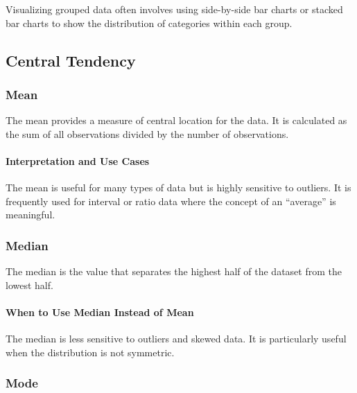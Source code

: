 \documentclass[
  b5paper]{book}
\begin{document}
Visualizing grouped data often involves using side-by-side bar charts or stacked bar charts to show the distribution of categories within each group.

\hypertarget{central-tendency}{%
\subsection{Central Tendency}\label{central-tendency}}

\hypertarget{mean}{%
\subsubsection{Mean}\label{mean}}

The mean provides a measure of central location for the data. It is calculated as the sum of all observations divided by the number of observations.

\hypertarget{interpretation-and-use-cases}{%
\paragraph{Interpretation and Use Cases}\label{interpretation-and-use-cases}}

The mean is useful for many types of data but is highly sensitive to outliers. It is frequently used for interval or ratio data where the concept of an ``average'' is meaningful.

\hypertarget{median}{%
\subsubsection{Median}\label{median}}

The median is the value that separates the highest half of the dataset from the lowest half.

\hypertarget{when-to-use-median-instead-of-mean}{%
\paragraph{When to Use Median Instead of Mean}\label{when-to-use-median-instead-of-mean}}

The median is less sensitive to outliers and skewed data. It is particularly useful when the distribution is not symmetric.

\hypertarget{mode}{%
\subsubsection{Mode}\label{mode}}
\end{document}
